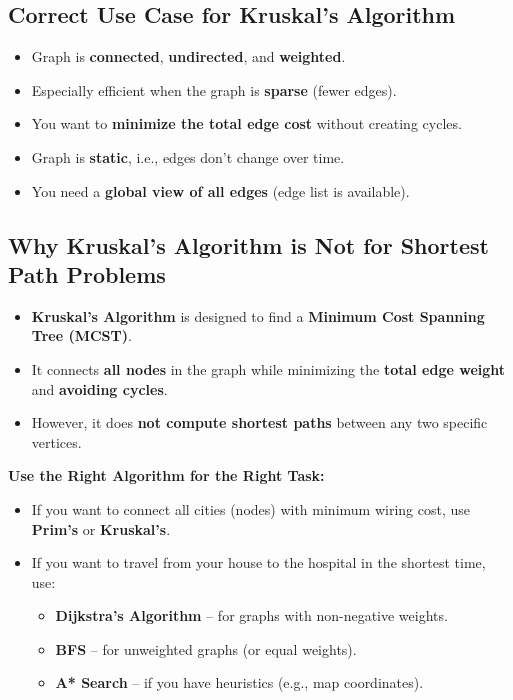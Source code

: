 \documentclass[a4paper,14pt]{extarticle}
\begin{document}
\subsection{Correct Use Case for Kruskal's Algorithm}

\begin{itemize}
    \item Graph is \textbf{connected}, \textbf{undirected}, and \textbf{weighted}.
    \item Especially efficient when the graph is \textbf{sparse} (fewer edges).
    \item You want to \textbf{minimize the total edge cost} without creating cycles.
    \item Graph is \textbf{static}, i.e., edges don't change over time.
    \item You need a \textbf{global view of all edges} (edge list is available).
\end{itemize}


\subsection{Why Kruskal's Algorithm is Not for Shortest Path Problems}

\begin{itemize}
    \item \textbf{Kruskal's Algorithm} is designed to find a \textbf{Minimum Cost Spanning Tree (MCST)}.
    \item It connects \textbf{all nodes} in the graph while minimizing the \textbf{total edge weight} and \textbf{avoiding cycles}.
    \item However, it does \textbf{not compute shortest paths} between any two specific vertices.
\end{itemize}

\textbf{Use the Right Algorithm for the Right Task:}
\begin{itemize}
    \item If you want to connect all cities (nodes) with minimum wiring cost, use \textbf{Prim's} or \textbf{Kruskal's}.
    \item If you want to travel from your house to the hospital in the shortest time, use:
    \begin{itemize}
        \item \textbf{Dijkstra's Algorithm} – for graphs with non-negative weights.
        \item \textbf{BFS} – for unweighted graphs (or equal weights).
        \item \textbf{A* Search} – if you have heuristics (e.g., map coordinates).
    \end{itemize}
\end{itemize}
\end{document}

